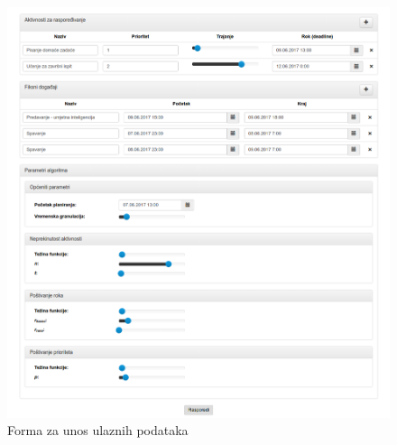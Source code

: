 \documentclass[times, utf8, zavrsni]{fer}
\begin{document}
\begin{figure}[]
\centering
\includegraphics[width=\textwidth]{resources/graphics/screenshot-form.png}
\caption{Forma za unos ulaznih podataka}
\label{img:forma}
\end{figure}
\end{document}
